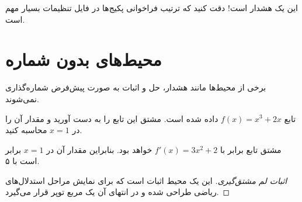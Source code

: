 \begin{warning}
\label{warn:sample}
این یک هشدار است! دقت کنید که ترتیب فراخوانی پکیج‌ها در فایل تنظیمات بسیار مهم است.
\end{warning}

\section{محیط‌های بدون شماره}
برخی از محیط‌ها مانند هشدار، حل و اثبات به صورت پیش‌فرض شماره‌گذاری نمی‌شوند.

\begin{question}
تابع $f(x) = x^3 + 2x$ داده شده است. مشتق این تابع را به دست آورید و مقدار آن را در $x=1$ محاسبه کنید.
\end{question}
\begin{solution}
مشتق تابع برابر با $f'(x) = 3x^2 + 2$ خواهد بود. بنابراین مقدار آن در $x=1$ برابر است با ۵.
\end{solution}

\begin{proof}[اثبات لم مشتق‌گیری]
این یک محیط اثبات است که برای نمایش مراحل استدلال‌های ریاضی طراحی شده و در انتهای آن یک مربع توپر قرار می‌گیرد.
\end{proof}
